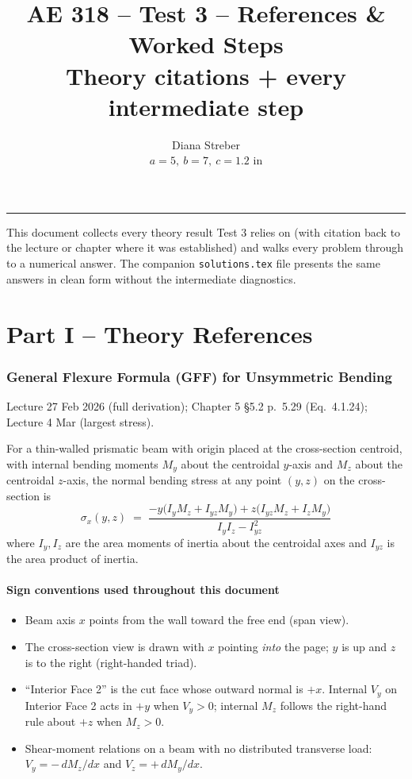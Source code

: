 \documentclass[11pt]{article}
\title{\textbf{AE 318 -- Test 3 -- References \& Worked Steps}\\\large Theory citations + every intermediate step}
\author{Diana Streber\\\small $a = 5,\ b = 7,\ c = 1.2$ in}
\date{}
\begin{document}
\maketitle
\hrule
\vspace{6pt}

This document collects every theory result Test 3 relies on (with citation back to the lecture or chapter where it was established) and walks every problem through to a numerical answer. The companion \texttt{solutions.tex} file presents the same answers in clean form without the intermediate diagnostics.

\part*{Part I -- Theory References}

\section{General Flexure Formula (GFF) for Unsymmetric Bending}

\begin{citebox}{Lecture 27 Feb 2026 (full derivation); Chapter 5 \S5.2 p.~5.29 (Eq.~4.1.24); Lecture 4 Mar (largest stress).}
\end{citebox}

For a thin-walled prismatic beam with origin placed at the cross-section centroid, with internal bending moments $M_y$ about the centroidal $y$-axis and $M_z$ about the centroidal $z$-axis, the normal bending stress at any point $(y, z)$ on the cross-section is
\begin{equation}
\boxed{\;\sigma_x(y, z) \;=\; \dfrac{-y\bigl(I_y M_z + I_{yz} M_y\bigr) + z\bigl(I_{yz} M_z + I_z M_y\bigr)}{I_y I_z - I_{yz}^2}\;}\label{eq:GFF}
\end{equation}
where $I_y, I_z$ are the area moments of inertia about the centroidal axes and $I_{yz}$ is the area product of inertia.

\subsection*{Sign conventions used throughout this document}

\begin{itemize}[leftmargin=2em, itemsep=1pt]
  \item Beam axis $x$ points from the wall toward the free end (span view).
  \item The cross-section view is drawn with $x$ pointing \emph{into} the page; $y$ is up and $z$ is to the right (right-handed triad).
  \item ``Interior Face 2'' is the cut face whose outward normal is $+x$. Internal $V_y$ on Interior Face 2 acts in $+y$ when $V_y > 0$; internal $M_z$ follows the right-hand rule about $+z$ when $M_z > 0$.
  \item Shear-moment relations on a beam with no distributed transverse load: $V_y = -\,dM_z/dx$ and $V_z = +\,dM_y/dx$.
\end{itemize}
\end{document}
